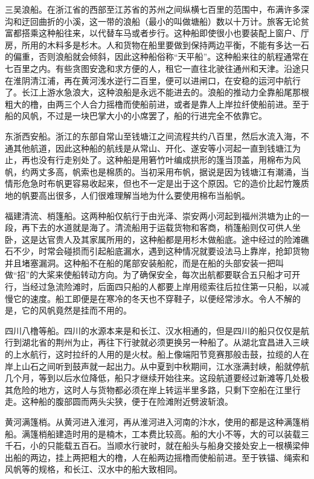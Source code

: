 \documentclass[12pt,UTF8]{ctexbook}
\begin{document}
三吴浪船。在浙江省的西部至江苏省的苏州之间纵横七百里的范围中，布满许多深沟和迂回曲折的小溪，这一带的浪船（最小的叫做塘船）数以十万计。旅客无论贫富都搭乘这种船往来，以代替车马或者步行。这种船即使很小也要装配上窗户、厅房，所用的木料多是杉木。人和货物在船里要做到保持两边平衡，不能有多达一石的偏重，否则浪船就会倾斜，因此这种船俗称“天平船”。这种船来往的航程通常在七百里之内。有些贪图安逸和求方便的人，租它一直往北驶往通州和天津。沿途只在淮阴清江浦，再在黄河浅水逆行二百里，便可以进闸口，在安稳的运河中航行了。长江上游水急浪大，这种浪船是永远不能进去的。浪船的推动力全靠船尾那根粗大的橹，由两三个人合力摇橹而使船前进，或者是靠人上岸拉纤使船前进。至于船的风帆，不过是一块巴掌大小的小席罢了，船的行进完全不依靠它。

东浙西安船。浙江的东部自常山至钱塘江之间流程共约八百里，然后水流入海，不通其他航道，因此这种船的航线是从常山、开化、遂安等小河起一直到钱塘江为止，再也没有行走别处了。这种船是用箬竹叶编成拱形的篷当顶盖，用棉布为风帆，约两丈多高，帆索也是棉质的。当初采用布帆，据说是因为钱塘江有潮涌，当情形危急时布帆更容易收起来，但也不一定是出于这个原因。它的造价比起竹篾质地的帆要高出很多，人们很难理解当地为什么要使用棉布当船帆。

福建清流、梢篷船。这两种船仅航行于由光泽、崇安两小河起到福州洪塘为止的一段，再下去的水道就是海了。清流船用于运载货物和客商，梢篷船则仅可供人坐卧，这是达官贵人及其家属所用的，这种船都是用杉木做船底。途中经过的险滩礁石不少，时常会碰损而引起船底漏水，遇到这种情况就要设法马上靠岸，抢卸货物并且堵塞漏洞。这种船不在船的尾部安装船舵，而是在船的头部安装一把叫做“招”的大桨来使船转动方向。为了确保安全，每次出航都要联合五只船才可开行，当经过急流险滩时，后面四只船的人都要上岸用缆索往后拉住第一只船，以减慢它的速度。船工即便是在寒冷的冬天也不穿鞋子，以便经常涉水。令人不解的是，它的风帆竟然是挂而不用的。

四川八橹等船。四川的水源本来是和长江、汉水相通的，但是四川的船只仅仅是航行到湖北省的荆州为止，再往下行驶就必须更换另一种船了。从湖北宜昌进入三峡的上水航行，这时拉纤的人用的是火杖。船上像端阳节竞赛那般击鼓，拉缆的人在岸上山石之间听到鼓声就一起出力。从中夏到中秋期间，江水涨满封峡，船就停航几个月，等到以后水位降低，船只才继续开始往来。这段航道要经过新滩等几处极其危险的地方，这时人与货物都必须在岸上转运半里多路，只剩下空船在江里行走。这种船的腹部圆而两头尖狭，便于在险滩附近劈波斩浪。

黄河满篷梢。从黄河进入淮河，再从淮河进入河南的汴水，使用的都是这种满篷梢船。满篷梢船建造时用的是楠木，工本费比较高。船的大小不等，大的可以装载三千石，小的只能载五百石。当顺水行驶时，就在船头与船身交接处安上一根横梁伸出船的两边，挂上两把粗大的橹，人在船两边摇橹而使船前进。至于铁锚、绳索和风帆等的规格，和长江、汉水中的船大致相同。
\end{document}

